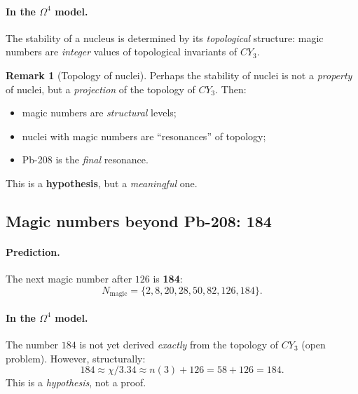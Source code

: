 \documentclass[11pt,a4paper]{article}
\newcommand{\CY}{CY_3}
\newcommand{\Om}{\Omega^4}
\theoremstyle{definition}
\newtheorem{remark}[theorem]{Remark}
\begin{document}
\paragraph{In the $\Om$ model.}
The stability of a nucleus is determined by its \emph{topological} 
structure: magic numbers are \emph{integer} 
values of topological invariants of $\CY$.

\begin{remark}[Topology of nuclei]
\label{rem:topology-nuclei}
Perhaps the stability of nuclei is not a \emph{property} of nuclei, but a 
\emph{projection} of the topology of $\CY$. Then:
\begin{itemize}
    \item magic numbers are \emph{structural} levels;
    \item nuclei with magic numbers are ``resonances'' 
          of topology;
    \item Pb-208 is the \emph{final} resonance.
\end{itemize}
This is a \textbf{hypothesis}, but a \emph{meaningful} one.
\end{remark}

\subsection{Magic numbers beyond Pb-208: 184}
\label{subsec:magic-beyond}

\paragraph{Prediction.}
The next magic number after $126$ is \textbf{184}:
\begin{equation}
    N_{\text{magic}} = \{2, 8, 20, 28, 50, 82, 126, 184\}.
\end{equation}

\paragraph{In the $\Om$ model.}
The number $184$ is not yet derived \emph{exactly} from the topology of $\CY$ 
(open problem). However, structurally:
\begin{equation}
    184 \approx \chi / 3.34 \approx n(3) + 126 = 58 + 126 = 184.
\end{equation}
This is a \emph{hypothesis}, not a proof.
\end{document}
